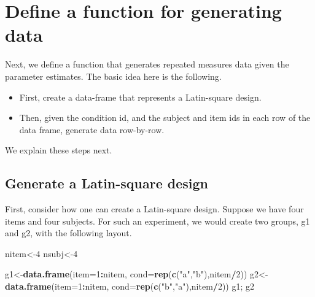 \documentclass[12pt,]{krantz}
\newenvironment{Shaded}{\begin{snugshade}}{\end{snugshade}}
\newcommand{\DataTypeTok}[1]{\textcolor[rgb]{0.13,0.29,0.53}{#1}}
\newcommand{\DecValTok}[1]{\textcolor[rgb]{0.00,0.00,0.81}{#1}}
\newcommand{\KeywordTok}[1]{\textcolor[rgb]{0.13,0.29,0.53}{\textbf{#1}}}
\newcommand{\NormalTok}[1]{#1}
\newcommand{\OperatorTok}[1]{\textcolor[rgb]{0.81,0.36,0.00}{\textbf{#1}}}
\newcommand{\StringTok}[1]{\textcolor[rgb]{0.31,0.60,0.02}{#1}}
\providecommand{\tightlist}{%
  \setlength{\itemsep}{0pt}\setlength{\parskip}{0pt}}
\begin{document}
\hypertarget{define-a-function-for-generating-data}{%
\section{Define a function for generating data}\label{define-a-function-for-generating-data}}

Next, we define a function that generates repeated measures data given the parameter estimates. The basic idea here is the following.

\begin{itemize}
\tightlist
\item
  First, create a data-frame that represents a Latin-square design.
\item
  Then, given the condition id, and the subject and item ids in each row of the data frame, generate data row-by-row.
\end{itemize}

We explain these steps next.

\hypertarget{generate-a-latin-square-design}{%
\subsection{Generate a Latin-square design}\label{generate-a-latin-square-design}}

First, consider how one can create a Latin-square design. Suppose we have four items and four subjects. For such an experiment, we would create two groups, g1 and g2, with the following layout.

\begin{Shaded}
\begin{Highlighting}[]
\NormalTok{nitem<-}\DecValTok{4}
\NormalTok{nsubj<-}\DecValTok{4}

\NormalTok{g1<-}\KeywordTok{data.frame}\NormalTok{(}\DataTypeTok{item=}\DecValTok{1}\OperatorTok{:}\NormalTok{nitem,}
                 \DataTypeTok{cond=}\KeywordTok{rep}\NormalTok{(}\KeywordTok{c}\NormalTok{(}\StringTok{"a"}\NormalTok{,}\StringTok{"b"}\NormalTok{),nitem}\OperatorTok{/}\DecValTok{2}\NormalTok{))}
\NormalTok{g2<-}\KeywordTok{data.frame}\NormalTok{(}\DataTypeTok{item=}\DecValTok{1}\OperatorTok{:}\NormalTok{nitem,}
                 \DataTypeTok{cond=}\KeywordTok{rep}\NormalTok{(}\KeywordTok{c}\NormalTok{(}\StringTok{"b"}\NormalTok{,}\StringTok{"a"}\NormalTok{),nitem}\OperatorTok{/}\DecValTok{2}\NormalTok{))}
\NormalTok{g1; g2}
\end{Highlighting}
\end{Shaded}
\end{document}
